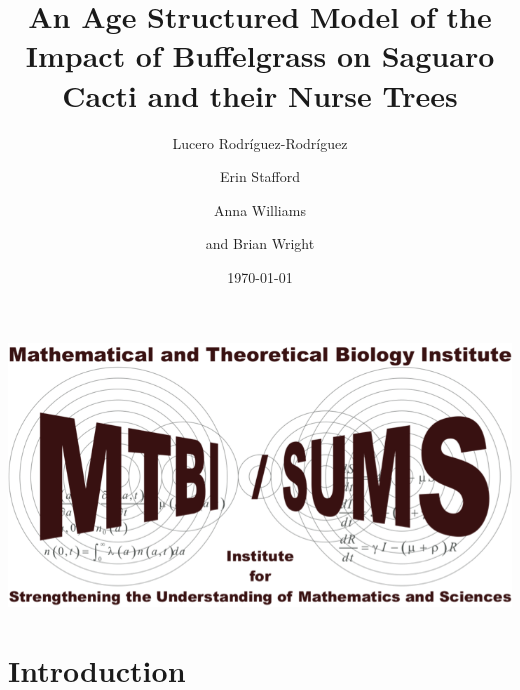 \documentclass{beamer}
\title{\small{An Age Structured Model of the Impact of Buffelgrass on Saguaro Cacti and their Nurse Trees}}
\author{Lucero Rodríguez-Rodríguez\inst{1} \and Erin Stafford\inst{2}\\
\and Anna Williams\inst{3}\and and  Brian Wright\inst{4}}
\institute
{
  \inst{1}University of Texas Rio Grande Valley
  \and
  \inst{2}Tulane University
  \and
  \inst{3}University of Texas at Austin
  \and
  \inst{4} University of Redlands
}
\date{\today}
\begin{document}
\begin{frame}
  \titlepage
\begin{center}
\vspace{-2cm} \hspace{8cm} \includegraphics[scale=.1]{MTBILogo.png}
\end{center}
\end{frame}

\section{Introduction}
\end{document}
